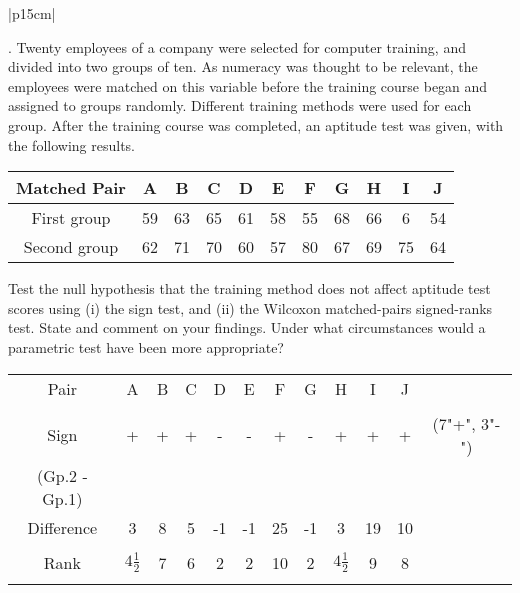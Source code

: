 \documentclass[a4paper,12pt]{article}
\begin{document}
\begin{table}[ht!]
     
\centering
     
\begin{tabular}{|p{15cm}|}
     
. Twenty employees of a company were selected for computer training, and divided into two
groups of ten. As numeracy was thought to be relevant, the employees were matched on this
variable before the training course began and assigned to groups randomly. Different
training methods were used for each group. After the training course was completed, an
aptitude test was given, with the following results.

\begin{center}
\begin{tabular}{|c|c|c|c|c|c|c|c|c|c|c|}
Matched Pair 	&	A 	&	B 	&	C 	&	D 	&	E 	&	F 	&	G 	&	H	&	 I 	&	J	\\ \hline
First group 	&	59	&	63	&	65	&	61	&	58	&	55	&	68	&	66	&	6	&	54	\\ \hline
Second group 	&	62	&	71	&	70	&	60	&	57	&	80	&	67	&	69	&	75	&	64	\\ \hline
\end{tabular}
\end{center}

Test the null hypothesis that the training method does not affect aptitude test scores using
(i) the sign test, and (ii) the Wilcoxon matched-pairs signed-ranks test. State and comment
on your findings. Under what circumstances would a parametric test have been more
appropriate?
\\ \hline
      
\end{tabular}
    
\end{table}


\begin{center}
\begin{tabular}{|c|c|c|c|c|c|c|c|c|c|c|c|}																				 \hline
Pair 	&	A 	&	B	&	 C 	&	D 	&	E 	&	F 	&	G 	&	H 	&	I 	&	J	&		\\
	&		&		&		&		&		&		&		&		&		&		&		\\ \hline
Sign  	&	 +	&	 + 	&	+ 	&	- 	&	- 	&	+ 	&	- 	&	+ 	&	+ 	&	+ 	&	(7"+", 3"-")	\\
(Gp.2 - Gp.1)	&		&		&		&		&		&		&		&		&		&		&		\\ \hline
Difference 	&	3	&	8	&	5	&	-1	&	-1 	&	25	&	-1 	&	3	&	19	&	10	&		\\
	&		&		&		&		&		&		&		&		&		&		&		\\ \hline
Rank 	&	$4\frac{1}{2}$	&	7	&	6	&	2	&	2	&	10	&	2	&	$4\frac{1}{2}$ 	&	9	&	8	&		\\
	&		&		&		&		&		&		&		&		&		&		&		\\ \hline
\end{tabular}
\end{center}
\end{document}
